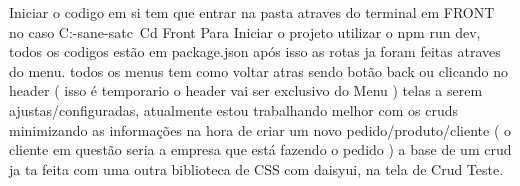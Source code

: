 Iniciar o codigo em si tem que entrar na pasta atraves do terminal em FRONT 
no caso 
C:\Users\nomedouser\MaxSane\max-sane-satc\ Cd Front
Para Iniciar o projeto utilizar o npm run dev, todos os codigos estão em package.json
após isso as rotas ja foram feitas atraves do menu. todos os menus tem como voltar atras
sendo botão back ou clicando no header ( isso é temporario o header vai ser exclusivo do Menu )
telas a serem ajustas/configuradas, atualmente estou trabalhando melhor com os cruds minimizando as informações 
na hora de criar um novo pedido/produto/cliente ( o cliente em questão seria a empresa que está fazendo o pedido )
a base de um crud ja ta feita com uma outra biblioteca de CSS com daisyui, na tela de Crud Teste.